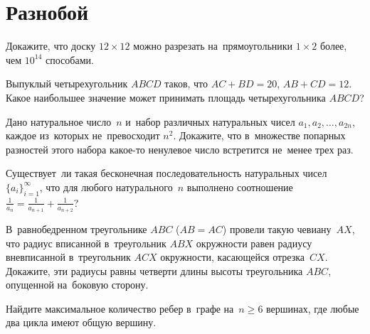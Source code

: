 
\section*{Разнобой}


\begin{problems}

\item
Докажите, что доску $12 \times 12$ можно разрезать на~прямоугольники
$1 \times 2$ более, чем $10^{14}$ способами.

\item
Выпуклый четырехугольник $ABCD$ таков, что $AC + BD = 20$, $AB + CD = 12$.
Какое наибольшее значение может принимать площадь четырехугольника $ABCD$?

\item
Дано натуральное число~$n$ и~набор различных натуральных чисел
$a_1, a_2, \ldots, a_{2n}$, каждое из~которых не~превосходит $n^2$.
Докажите, что в~множестве попарных разностей этого набора какое-то ненулевое
число встретится не~менее трех раз.

\item
Существует~ли такая бесконечная последовательность натуральных чисел
$\{ a_{i} \}_{i=1}^{\infty}$, что для любого натурального~$n$ выполнено
соотношение
\(
    \frac{1}{a_{n}}
=
    \frac{1}{a_{n+1}} + \frac{1}{a_{n+2}}
\)?

\item
В~равнобедренном треугольнике $ABC$ ($AB = AC$) провели такую чевиану~$AX$, что
радиус вписанной в~треугольник $ABX$ окружности равен радиусу вневписанной
в~треугольник $ACX$ окружности, касающейся отрезка~$CX$.
Докажите, эти радиусы равны четверти длины высоты треугольника $ABC$, опущенной
на~боковую сторону.

\item
Найдите максимальное количество ребер в~графе на~$n \geq 6$ вершинах, где любые
два цикла имеют общую вершину.

\end{problems}

